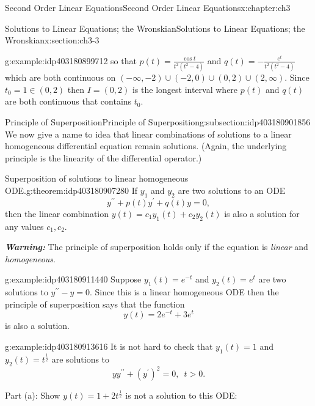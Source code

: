 \documentclass[oneside,10pt,]{book}
\newcommand{\alert}[1]{\textbf{\textit{#1}}}
\numberwithin{equation}{section}
\numberwithin{equation}{section}
\begin{document}
\begin{chapterptx}{Second Order Linear Equations}{}{Second Order Linear Equations}{}{}{x:chapter:ch3}
\begin{sectionptx}{Solutions to Linear Equations; the Wronskian}{}{Solutions to Linear Equations; the Wronskian}{}{}{x:section:ch3-3}
\begin{introduction}{}
\begin{example}{}{g:example:idp403180899712}
so that \(p(t)=\frac{\cos t}{t^{2}\left(t^{2}-4\right)}\) and \(q(t)=-\frac{e^{t}}{t^{2}\left(t^{2}-4\right)}\) which are both continuous on \(\left(-\infty,-2\right)\cup\left(-2,0\right)\cup\left(0,2\right)\cup\left(2,\infty\right)\). Since \(t_{0}=1\in\left(0,2\right)\) then \(I=\left(0,2\right)\) is the longest interval where \(p(t)\) and \(q(t)\) are both continuous that contains \(t_{0}\).%
\end{example}
\end{introduction}%
%
%
\typeout{************************************************}
\typeout{************************************************}
%
\begin{subsectionptx}{Principle of Superposition}{}{Principle of Superposition}{}{}{g:subsection:idp403180901856}
We now give a name to idea that linear combinations of solutions to a linear homogeneous differential equation remain solutions. (Again, the underlying principle is the linearity of the differential operator.)%
\begin{theorem}{Superposition of solutions to linear homogeneous ODE.}{}{g:theorem:idp403180907280}%
If \(y_{1}\) and \(y_{2}\) are two solutions to an ODE%
\begin{equation*}
y^{\prime\prime}+p(t)y^{\prime}+q(t)y=0,
\end{equation*}
then the linear combination \(y(t)=c_{1}y_{1}(t)+c_{2}y_{2}(t)\) is also a solution for any values \(c_{1},c_{2}\).%
\end{theorem}
\alert{Warning:} The principle of superposition holds only if the equation is \emph{linear} and \emph{homogeneous}.%
\begin{example}{}{g:example:idp403180911440}%
Suppose \(y_{1}(t)=e^{-t}\) and \(y_{2}(t)=e^{t}\) are two solutions to \(y^{\prime\prime}-y=0\). Since this is a linear homogeneous ODE then the principle of superposition says that the function%
\begin{equation*}
y(t)=2e^{-t}+3e^{t}
\end{equation*}
is also a solution.%
\end{example}
\begin{example}{}{g:example:idp403180913616}%
It is not hard to check that \(y_{1}(t)=1\) and \(y_{2}(t)=t^{\frac{1}{2}}\) are solutions to%
\begin{equation*}
yy^{\prime\prime}+\left(y^{\prime}\right)^{2}=0,\,\,\,t>0.
\end{equation*}
%
\par
Part (a): Show \(y(t)=1+2t^{\frac{1}{2}}\) is not a solution to this ODE:%

\end{example}
\end{subsectionptx}
\end{sectionptx}
\end{chapterptx}
\end{document}
